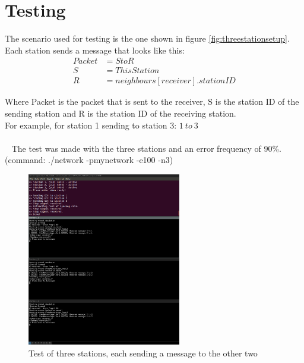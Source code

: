 \section{Testing}
The scenario used for testing is the one shown in figure \ref{fig:threestationsetup}.\\
Each station sends a message that looks like this:\\

\begin{align*}
Packet &= S to R\\
S &= ThisStation\\
R &= neighbours[receiver].stationID
\end{align*}

Where Packet is the packet that is sent to the receiver, S is the station ID of the sending station and R is the station ID of the receiving station.\\
For example, for station 1 sending to station 3: $1\ to\ 3$\\
\\~
The test was made with the three stations and an error frequency of 90\%. (command: ./network -pmynetwork -e100 -n3)
\begin{figure}[H]
\centering
\includegraphics[width=0.6\textwidth]{Test1.png}
\caption{Test of three stations, each sending a message to the other two}
\label{fig:threestationtest}
\end{figure}




